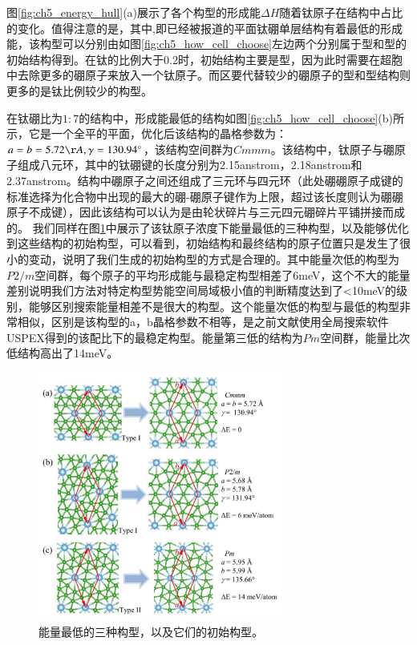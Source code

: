 图\ref{fig:ch5_energy_hull}(a)展示了各个构型的形成能$\Delta H$随着钛原子在结构中占比的变化。值得注意的是，其中,即已经被报道的平面钛硼单层结构有着最低的形成能，该构型可以分别由如图\ref{fig:ch5_how_cell_choose}左边两个分别属于型和型的初始结构得到。在钛的比例大于\num{0.2}时，初始结构主要是型，因为此时需要在超胞中去除更多的硼原子来放入一个钛原子。而区要代替较少的硼原子的型和型结构则更多的是钛比例较少的构型。

在钛硼比为$1:7$的结构中，形成能最低的结构如图\ref{fig:ch5_how_cell_choose}(b)所示，它是一个全平的平面，优化后该结构的晶格参数为：$a=b=5.72\AA,\gamma=130.94^{\circ}$，该结构空间群为$Cmmm$。该结构中，钛原子与硼原子组成八元环，其中的钛硼键的长度分别为\num{2.15}\si{anstrom}，\num{2.18}\si{anstrom}和\num{2.37}\si{anstrom}。结构中硼原子之间还组成了三元环与四元环（此处硼硼原子成键的标准选择为化合物中出现的最大的硼-硼原子键作为上限，超过该长度则认为硼硼原子不成键），因此该结构可以认为是由轮状碎片与三元四元硼碎片平铺拼接而成的。
我们同样在图\ref{fig:ch5_tib7_last3}中展示了该钛原子浓度下能量最低的三种构型，以及能够优化到这些结构的初始构型，可以看到，初始结构和最终结构的原子位置只是发生了很小的变动，说明了我们生成的初始构型的方式是合理的。其中能量次低的构型为$P2/m$空间群，每个原子的平均形成能与最稳定构型相差了6meV，这个不大的能量差别说明我们方法对特定构型势能空间局域极小值的判断精度达到了<10meV的级别，能够区别搜索能量相差不是很大的构型。这个能量次低的构型与最低的构型非常相似，区别是该构型的a，b晶格参数不相等，是之前文献使用全局搜索软件USPEX得到的该配比下的最稳定构型。能量第三低的结构为$Pm$空间群，能量比次低结构高出了14meV。

\begin{figure}
  \includegraphics[width=0.72\textwidth]{figs/ch5_tib7_last3.png}
  \centering
  \caption{能量最低的三种构型，以及它们的初始构型。}
  \label{fig:ch5_tib7_last3}
\end{figure}

